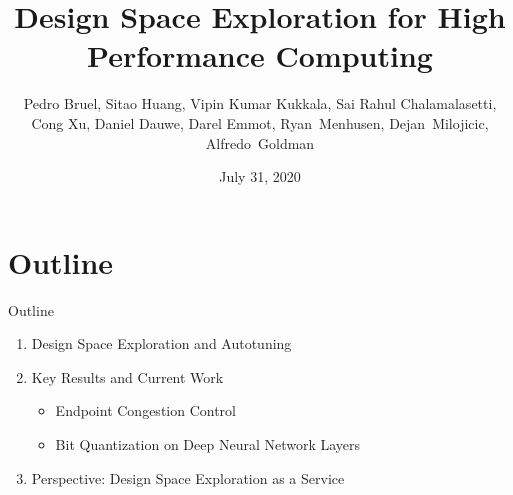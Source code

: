 \documentclass[10pt, compress, aspectratio=169, xcolor={table,usenames,dvipsnames}]{beamer}
\author{ \footnotesize Pedro Bruel, Sitao Huang, Vipin Kumar Kukkala, Sai Rahul Chalamalasetti, Cong Xu, Daniel Dauwe, Darel Emmot, \mbox{Ryan Menhusen}, \mbox{Dejan Milojicic}, \mbox{Alfredo Goldman}}
\date{ \scriptsize July 31, 2020}
\title{Design Space Exploration for High Performance Computing}
\begin{document}
\maketitle

\section{Outline}
\label{sec:org65aa6e0}
\begin{frame}[label={sec:orgc015660}]{Outline}
\begin{enumerate}
\item Design Space Exploration and Autotuning
\item Key Results and Current Work
\begin{itemize}
\item Endpoint Congestion Control
\item Bit Quantization on Deep Neural Network Layers
\end{itemize}
\item Perspective: Design Space Exploration as a Service
\end{enumerate}
\end{frame}
\end{document}
